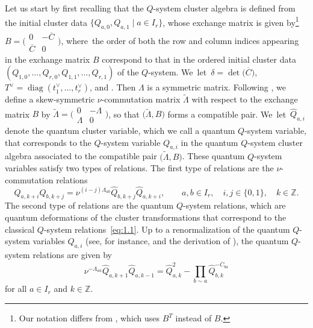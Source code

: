 \documentclass[pdftex]{sigma}
\numberwithin{equation}{section}
\DeclareMathOperator{\diag}{diag}
\begin{document}
Let us start by first recalling that the  $Q$-system cluster algebra is defined from the initial cluster data $\{Q_{a,0},Q_{a,1}\mid a\in I_r\}$, whose exchange matrix is given by\footnote{Our notation differs from \cite{Williams15}, which uses $B^T$ instead of $B$.}
$
B
=\big(\begin{smallmatrix}
0 & -\overline{C} \\
\overline{C} & 0
\end{smallmatrix}\big)$,
where~the order of both the row and column indices appearing in the exchange matrix $B$ correspond to that in the ordered initial cluster data $(Q_{1,0},\dots,Q_{r,0},Q_{1,1},\dots,Q_{r,1})$ of the  $Q$-system. We~let~${\delta=\det\bigl(\overline{C}\bigr)}$, $T^{\vee}=\diag(t_1^{\vee} ,\dots,t_r^{\vee})$, and . Then $\Lambda$ is a symmetric matrix. Following \cite[Definition 3.1]{BZ05}, we define a skew-symmetric $\nu$-commutation matrix $\tilde{\Lambda}$ with respect to the exchange matrix $B$ by
$
\tilde{\Lambda}=\big(
\begin{smallmatrix}
0 & -\Lambda \\
\Lambda & 0
\end{smallmatrix}\big)$,
so that $\bigl(\tilde{\Lambda},B\bigr)$ forms a compatible pair. We~let~$\widehat{Q}_{a,i}$ denote the quantum cluster variable, which we call a quantum $Q$-system variable, that corresponds to the $Q$-system variable $Q_{a,i}$ in the quantum  $Q$-system cluster algebra associated to the compatible pair $\bigl(\tilde{\Lambda},B\bigr)$. These quantum $Q$-system variables satisfy two types of relations. The first type of relations are the $\nu$-commutation relations
\begin{equation*}
\widehat{Q}_{a,k+i}\widehat{Q}_{b,k+j}=\nu^{(i-j)\Lambda_{ab}} \widehat{Q}_{b,k+j}\widehat{Q}_{a,k+i},\qquad a,b\in I_r,\quad i,j\in\{0,1\},\quad k\in\mathbb{Z}.
\end{equation*}
The second type of relations are the quantum  $Q$-system relations, which are quantum deformations of the cluster transformations that correspond to the classical  $Q$-system relations~\eqref{eq:1.1}. Up to a renormalization of the quantum $Q$-system variables $\widehat{Q}_{a,i}$ (see, for instance, \cite[Lemma~4.4]{DFK21} and the derivation of \cite[equation~(3.20)]{Lin21}), the quantum  $Q$-system relations are given by
\begin{equation}\label{eq:4.4}
\nu^{-\Lambda_{aa}}\widehat{Q}_{a,k+1}\widehat{Q}_{a,k-1}= \widehat{Q}_{a,k}^2-\prod_{b\sim a}\widehat{Q}_{b,k}^{-\overline{C}_{ba}}
\end{equation}
for all $a\in I_r$ and $k\in\mathbb{Z}$.
\end{document}
